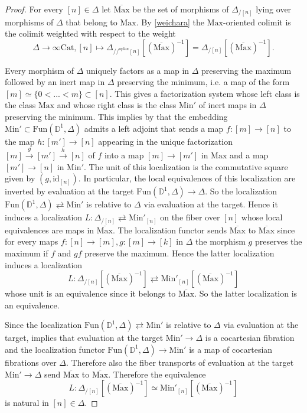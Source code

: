 \documentclass[10pt,oneside]{article}
\numberwithin{equation}{section} %
\numberwithin{figure}{section} %
\theoremstyle{plain}
\theoremstyle{definition}
\newcommand{\bD}{{\mathbb D}}
\newcommand{\Min}{\mathrm{Min}}
\newcommand{\Max}{\mathrm{Max}}
\newcommand{\id}{\mathrm{id}}
\newcommand{\Cat}{\mathrm{Cat}}
\newcommand{\Fun}{\mathrm{Fun}}
\newcommand{\oplax}{{\mathrm{oplax}}}
\begin{document}
\begin{proof}

For every $[n] \in \Delta$ let $ \overline{\Max}$ be the set of morphisms of $\Delta_{/ [n]}$ lying over morphisms of $\Delta$ that belong to $\Max.$
By \cref{weichara} the $\Max$-oriented colimit is the colimit weighted with respect to the weight $$ \Delta \to \infty\Cat, [n] \mapsto \Delta_{//^\oplax [n]}[(\overline{\Max})^{-1}]= \Delta_{/ [n]} [(\overline{\Max})^{-1}].$$

Every morphism of $\Delta$ uniquely factors as a map in $\Delta$ preserving the maximum followed by an inert map in $\Delta$ preserving the minimum, i.e. a map of the form $[m] \simeq \{0 < ... < m \} \subset [n]$. This gives a factorization system whose left class is the class $\Max$ and whose right class is the class $\Min'$ of inert maps in $\Delta$ preserving the minimum.
This implies by \cite[Theorem 2.2.12.]{gepner2026homotopy} that the embedding $\Min' \subset \Fun(\bD^1,\Delta)$
admits a left adjoint that sends a map $f: [m] \to [n]$ to the map
$h: [m'] \to [n]$ appearing in the unique factorization $ [m] \xrightarrow{g} [m'] \xrightarrow{h} [n]$ of $f$ into a map $ [m] \to [m']$ in $\Max$ and a map $[m'] \to [n]$ in $\Min'.$ The unit of this localization is the commutative square given by $(g, \id_{[n]}).$
In particular, the local equivalences of this localization are inverted by evaluation at the target $ \Fun(\bD^1,\Delta) \to \Delta.$
So the localization $\Fun(\bD^1,\Delta) \rightleftarrows \Min'$ is relative to $\Delta$ via evaluation at the target. Hence it induces a localization $L: \Delta_{/ [n]} \rightleftarrows \Min'_{[n]} $ on the fiber over $ [n]$ whose local equivalences are maps in $\overline{\Max}.$
The localization functor sends $\overline{\Max} $ to $\overline{\Max}$
since for every maps $f: [n] \to [m],g: [m] \to [k]$ in $\Delta$ the morphism $g$ preserves the maximum if $f $ and $g f$ preserve the maximum.
Hence the latter localization induces a localization
$$ L: \Delta_{/ [n]}[(\overline{\Max})^{-1}] \rightleftarrows \Min'_{[n]}[(\overline{\Max})^{-1}]$$ whose unit is an equivalence since it belongs to
$\overline{\Max} $. So the latter localization is an equivalence.

Since the localization $\Fun(\bD^1,\Delta) \rightleftarrows \Min'$ is relative to $\Delta$ via evaluation at the target, \cite[Lemma 2.2.4.11., Remark 2.2.4.12.]{lurie.higheralgebra} implies that evaluation at the target $\Min' \to \Delta$ is a cocartesian fibration and the localization functor $ \Fun(\bD^1,\Delta) \to \Min'$ is a map of cocartesian fibrations
over $\Delta.$
Therefore also the fiber transports of evaluation at the target $\Min' \to \Delta$ send $\overline{\Max} $ to $\overline{\Max}$.
Therefore the equivalence $$ L: \Delta_{/ [n]}[(\overline{\Max})^{-1}] \simeq \Min'_{[n]}[(\overline{\Max})^{-1}]$$
is natural in $[n] \in \Delta.$


\end{proof}
\end{document}
